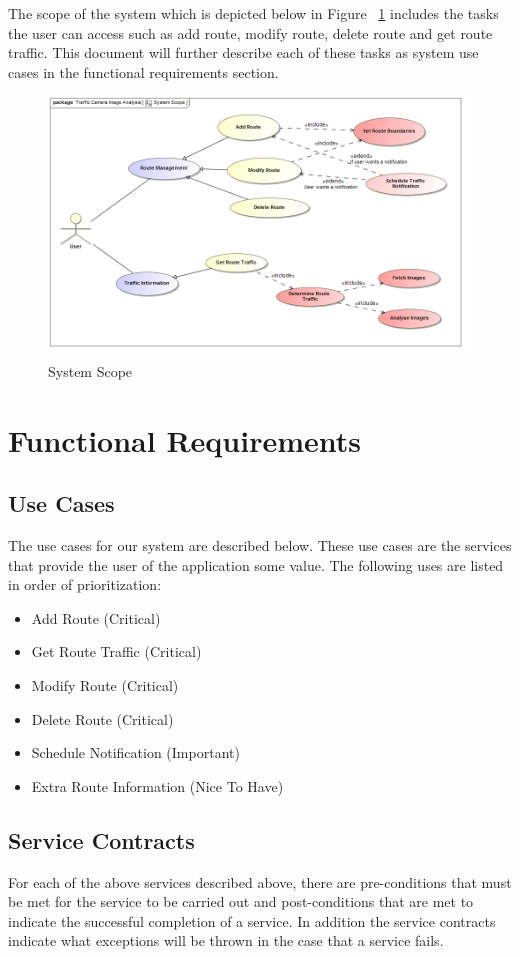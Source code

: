 \documentclass[a4paper,12pt]{article}
\begin{document}
The scope of the system which is depicted below in Figure ~\ref{fig:SystemScope} includes the tasks the user can access such as add route, modify route, delete route and get route traffic. This document will further describe each of these tasks as system use cases in the functional requirements section.
\begin{figure}[ht]
\includegraphics[width=\textwidth]{images/System_Scope.jpg}
\caption{System Scope}
\label{fig:SystemScope}
\end{figure}

\section{Functional Requirements}
\subsection{Use Cases}
The use cases for our system are described below. These use cases are the services that provide the user of the application some value. The following uses are listed in order of prioritization:
\begin{itemize}
\item Add Route 			(Critical)
\item Get Route Traffic		(Critical)
\item Modify Route			(Critical)
\item Delete Route			(Critical)
\item Schedule Notification (Important)
\item Extra Route Information 	(Nice To Have)
\end{itemize}
\subsection{Service Contracts}
For each of the above services described above, there are pre-conditions that must be met for the service to be carried out and post-conditions that are met to indicate the successful completion of a service. In addition the service contracts indicate what exceptions will be thrown in the case that a service fails.
\end{document}
